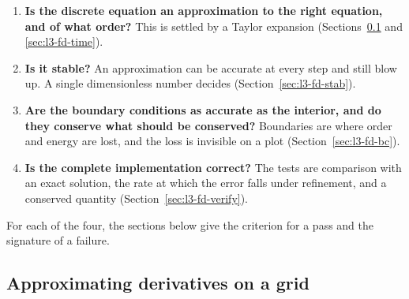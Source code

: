 \begin{enumerate}[itemsep=1pt,topsep=2pt]
\item \textbf{Is the discrete equation an approximation to the right equation, and of what order?} This is settled by a Taylor expansion (Sections~\ref{sec:l3-fd-space} and \ref{sec:l3-fd-time}).
\item \textbf{Is it stable?} An approximation can be accurate at every step and still blow up. A single dimensionless number decides (Section~\ref{sec:l3-fd-stab}).
\item \textbf{Are the boundary conditions as accurate as the interior, and do they conserve what should be conserved?} Boundaries are where order and energy are lost, and the loss is invisible on a plot (Section~\ref{sec:l3-fd-bc}).
\item \textbf{Is the complete implementation correct?} The tests are comparison with an exact solution, the rate at which the error falls under refinement, and a conserved quantity (Section~\ref{sec:l3-fd-verify}).
\end{enumerate}

For each of the four, the sections below give the criterion for a pass and the signature of a failure.

\subsection{Approximating derivatives on a grid}
\label{sec:l3-fd-space}

